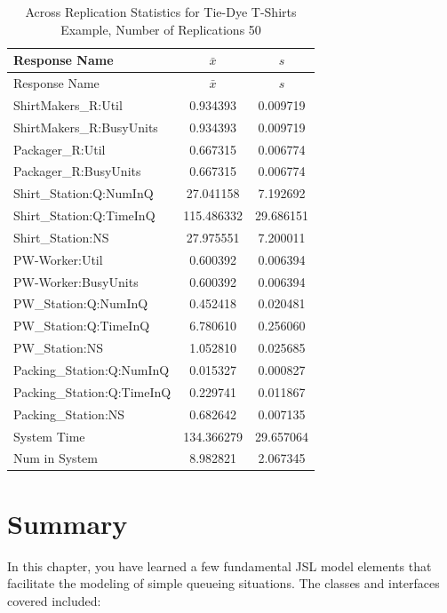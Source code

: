 \documentclass[
]{book}
\theoremstyle{definition}
\theoremstyle{definition}
\theoremstyle{definition}
\theoremstyle{definition}
\theoremstyle{remark}
\begin{document}
\begin{longtable}[]{@{}lcc@{}}
\caption{Across Replication Statistics for Tie-Dye T-Shirts Example, Number of Replications 50}\tabularnewline
\toprule
Response Name & \(\bar{x}\) & \(s\) \\
\midrule
\endfirsthead
\toprule
Response Name & \(\bar{x}\) & \(s\) \\
\midrule
\endhead
ShirtMakers\_R:Util & 0.934393 & 0.009719 \\
ShirtMakers\_R:BusyUnits & 0.934393 & 0.009719 \\
Packager\_R:Util & 0.667315 & 0.006774 \\
Packager\_R:BusyUnits & 0.667315 & 0.006774 \\
Shirt\_Station:Q:NumInQ & 27.041158 & 7.192692 \\
Shirt\_Station:Q:TimeInQ & 115.486332 & 29.686151 \\
Shirt\_Station:NS & 27.975551 & 7.200011 \\
PW-Worker:Util & 0.600392 & 0.006394 \\
PW-Worker:BusyUnits & 0.600392 & 0.006394 \\
PW\_Station:Q:NumInQ & 0.452418 & 0.020481 \\
PW\_Station:Q:TimeInQ & 6.780610 & 0.256060 \\
PW\_Station:NS & 1.052810 & 0.025685 \\
Packing\_Station:Q:NumInQ & 0.015327 & 0.000827 \\
Packing\_Station:Q:TimeInQ & 0.229741 & 0.011867 \\
Packing\_Station:NS & 0.682642 & 0.007135 \\
System Time & 134.366279 & 29.657064 \\
Num in System & 8.982821 & 2.067345 \\
\bottomrule
\end{longtable}

\hypertarget{dem:summary}{%
\section{Summary}\label{dem:summary}}

In this chapter, you have learned a few fundamental JSL model elements
that facilitate the modeling of simple queueing situations. The classes
and interfaces covered included:
\end{document}
